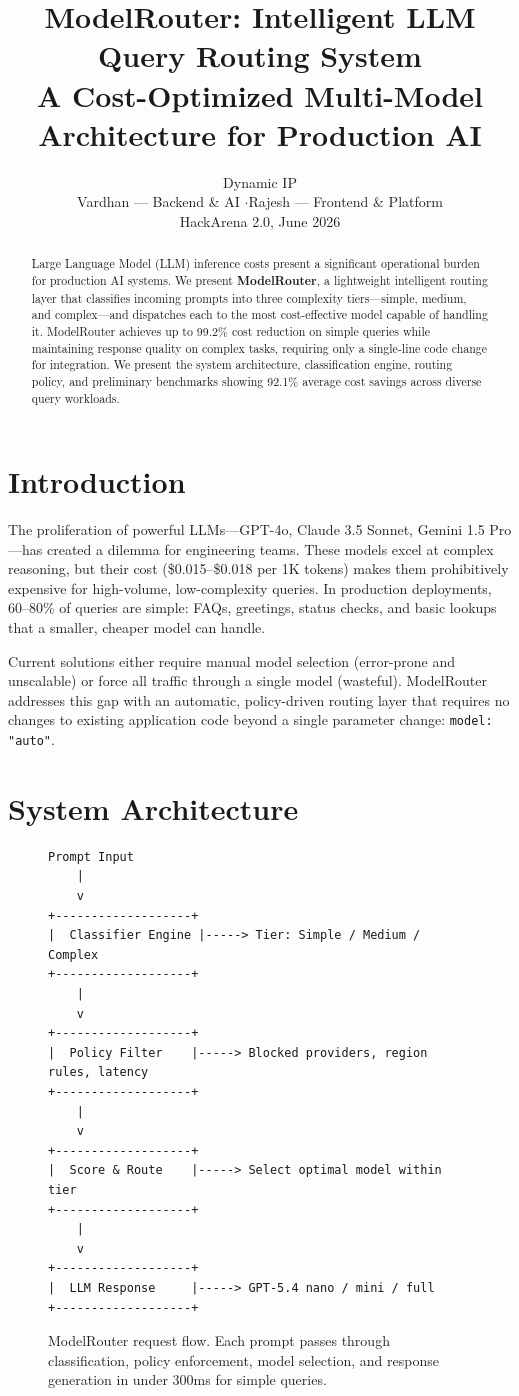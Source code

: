 \documentclass[11pt,a4paper]{article}
\title{\textbf{ModelRouter: Intelligent LLM Query Routing System} \\
\large A Cost-Optimized Multi-Model Architecture for Production AI}
\author{Dynamic IP \\
\small Vardhan --- Backend \& AI \quad$\cdot$\quad Rajesh --- Frontend \& Platform \\
\small HackArena 2.0, June 2026}
\date{}
\begin{document}
\maketitle

\begin{abstract}
Large Language Model (LLM) inference costs present a significant operational burden for production AI systems. We present \textbf{ModelRouter}, a lightweight intelligent routing layer that classifies incoming prompts into three complexity tiers---simple, medium, and complex---and dispatches each to the most cost-effective model capable of handling it. ModelRouter achieves up to 99.2\% cost reduction on simple queries while maintaining response quality on complex tasks, requiring only a single-line code change for integration. We present the system architecture, classification engine, routing policy, and preliminary benchmarks showing 92.1\% average cost savings across diverse query workloads.
\end{abstract}

\section{Introduction}

The proliferation of powerful LLMs---GPT-4o, Claude 3.5 Sonnet, Gemini 1.5 Pro---has created a dilemma for engineering teams. These models excel at complex reasoning, but their cost (\$0.015--\$0.018 per 1K tokens) makes them prohibitively expensive for high-volume, low-complexity queries. In production deployments, 60--80\% of queries are simple: FAQs, greetings, status checks, and basic lookups that a smaller, cheaper model can handle.

Current solutions either require manual model selection (error-prone and unscalable) or force all traffic through a single model (wasteful). ModelRouter addresses this gap with an automatic, policy-driven routing layer that requires no changes to existing application code beyond a single parameter change: \texttt{model: "auto"}.

\section{System Architecture}

\begin{figure}[h]
\centering
\begin{lstlisting}[frame=single]
Prompt Input
    |
    v
+-------------------+
|  Classifier Engine |-----> Tier: Simple / Medium / Complex
+-------------------+
    |
    v
+-------------------+
|  Policy Filter    |-----> Blocked providers, region rules, latency
+-------------------+
    |
    v
+-------------------+
|  Score & Route    |-----> Select optimal model within tier
+-------------------+
    |
    v
+-------------------+
|  LLM Response     |-----> GPT-5.4 nano / mini / full
+-------------------+
\end{lstlisting}
\caption{ModelRouter request flow. Each prompt passes through classification, policy enforcement, model selection, and response generation in under 300ms for simple queries.}
\end{figure}
\end{document}
